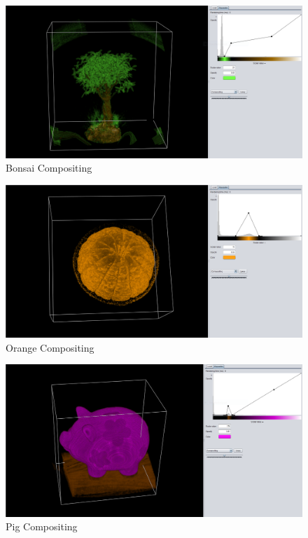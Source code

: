 \documentclass[a4paper,twoside,11pt]{article}
\begin{document}
\begin{figure}[h!]
    \includegraphics[width=\textwidth]{Images/BonsaiCOMP.png}
    \caption{Bonsai Compositing}
    \label{fig:BonsaiCOMP}
\end{figure}

\begin{figure}[h!]
    \includegraphics[width=\textwidth]{Images/OrangeCOMP.png}
    \caption{Orange Compositing}
    \label{fig:OrangeCOMP}
\end{figure}

\begin{figure}[h!]
    \includegraphics[width=\textwidth]{Images/PigCOMP.png}
    \caption{Pig Compositing}
    \label{fig:PigCOMP}
\end{figure} \newpage
\end{document}
